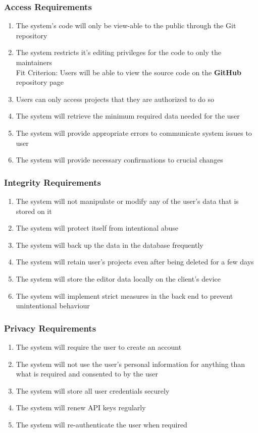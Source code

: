 \documentclass[12pt, titlepage]{article}
\begin{document}
	\subsubsection{Access Requirements}
	\begin{enumerate}[resume*]
		\item The system’s code will only be view-able to the public through the Git repository
		\item The system restricts it's editing privileges for the code to only the maintainers\\
		{\color{red}Fit Criterion: Users will be able to view the source code on the \textbf{GitHub} repository page}
		\item Users can only access projects that they are authorized to do so
		\item The system will retrieve the minimum required data needed for the user
		\item The system will provide appropriate errors to communicate system issues to user
		\item The system will provide necessary confirmations to crucial changes
	\end{enumerate}
	
	\subsubsection{Integrity Requirements}
	\begin{enumerate}[resume*]
		\item The system will not manipulate or modify any of the user’s data that is stored on it
		\item The system will protect itself from intentional abuse
		\item The system will back up the data in the database frequently
		\item The system will retain user's projects even after being deleted for a few days 
		\item The system will store the editor data locally on the client's device 
		\item The system will implement strict measures in the back end to prevent unintentional behaviour
	\end{enumerate}
	
	\subsubsection{Privacy Requirements}
	\begin{enumerate}[resume*]
		\item The system will require the user to create an account
		\item The system will not use the user's personal information for anything than what is required and consented to by the user
		\item The system will store all user credentials securely
		\item The system will renew API keys regularly
		\item The system will re-authenticate the user when required
	\end{enumerate}
	
\end{document}

